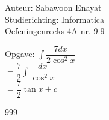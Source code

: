 \documentclass[a4paper]{article}
\begin{document}
  
\noindent \large Auteur: Sabawoon Enayat \\
\noindent \large Studierichting: Informatica\\
\noindent \large Oefeningenreeks 4A nr. 9.9 \\

\newcommand{\dint}{\displaystyle\int}

\medskip

\normalsize

Opgave: $\dint \dfrac{7 dx}{2\cos^2 x}$\\

$= \dfrac{7}{2}\dint \dfrac{dx}{\cos^2 x}$\\

$= \dfrac{7}{2}\tan x + c$\\

\begin{thebibliography}{999}
\end{thebibliography}
\end{document}
